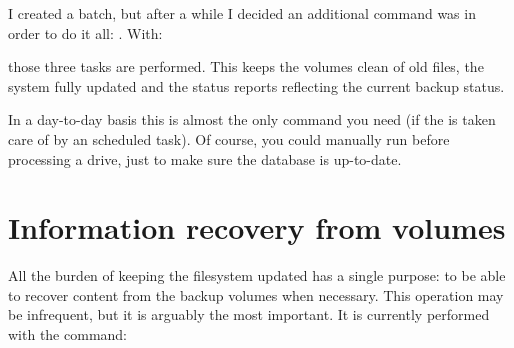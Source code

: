 \documentclass[letterpaper,10pt,english]{sphinxmanual}
\begin{document}
I created a batch, but after a while I decided an additional command was in order to do it all: . With:

\begin{sphinxVerbatim}[commandchars=\\\{\}]
   
\end{sphinxVerbatim}

those three tasks are performed. This keeps the volumes clean of old files, the system fully updated and the status reports
reflecting the current backup status.

In a day-to-day basis this is almost the only command you need (if the  is taken care of by an scheduled task).
Of course, you could manually run  before processing a drive, just to make sure the database is up-to-date.


\section{Information recovery from volumes}
\label{\detokenize{index:information-recovery-from-volumes}}
All the burden of keeping the filesystem updated has a single purpose: to be able to recover content from the backup volumes
when necessary. This operation may be infrequent, but it is arguably the most important. It is currently performed with the
 command:

\begin{sphinxVerbatim}[commandchars=\\\{\}]
    \PYGZbs{}\PYGZbs{}\PYGZbs{}\PYGZbs{}\PYGZbs{}\PYGZbs{} \PYGZbs{}\PYGZbs{}
\end{sphinxVerbatim}
\end{document}
